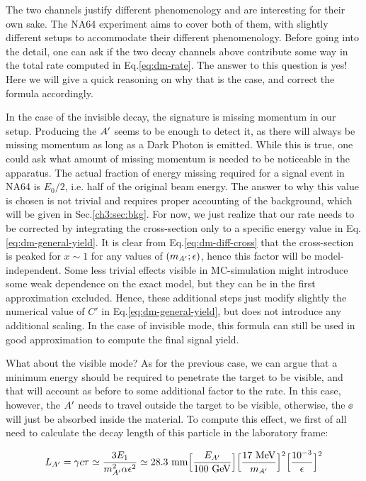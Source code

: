 The two channels justify different phenomenology and are interesting for their own sake. The NA64 experiment aims to cover both of them, with slightly different setups to accommodate their different phenomenology. Before going into the detail, one can ask if the two decay channels above contribute some way in the total rate computed in Eq.\ref{eq:dm-rate}. The answer to this question is yes! Here we will give a quick reasoning on why that is the case, and correct the formula accordingly.

In the case of the invisible decay, the signature is missing momentum in our setup. Producing the $A'$ seems to be enough to detect it, as there will always be missing momentum as long as a Dark Photon is emitted. While this is true, one could ask what amount of missing momentum is needed to be noticeable in the apparatus. The actual fraction of energy missing required for a signal event in NA64 is $E_0/2$, i.e. half of the original beam energy. The answer to why this value is chosen is not trivial and requires proper accounting of the background, which will be given in Sec.\ref{ch3:sec:bkg}.  For now, we just realize that our rate needs to be corrected by integrating the cross-section only to a specific energy value in Eq.\ref{eq:dm-general-yield}. It is clear from Eq.\ref{eq:dm-diff-cross} that the cross-section is peaked for $x \sim 1$ for any values of $(m_{A'};\epsilon)$, hence this factor will be model-independent. Some less trivial effects visible in MC-simulation might introduce some weak dependence on the exact model, but they can be in the first approximation excluded. Hence, these additional steps just modify slightly the numerical value of $C'$ in Eq.\ref{eq:dm-general-yield}, but does not introduce any additional scaling. In the case of invisible mode, this formula can still be used in good approximation to compute the final signal yield.

What about the visible mode? As for the previous case, we can argue that a minimum energy should be required to penetrate the target to be visible, and that will account as before to some additional factor to the rate. In this case, however, the $A'$ needs to travel outside the target to be visible, otherwise, the $\ee$ will just be absorbed inside the material. To compute this effect, we first of all need to calculate the decay length of this particle in the laboratory frame:

\begin{eqnarray}
  L_{A'} = \gamma c \tau \simeq \frac{3E_1}{m^2_{A'}\alpha \epsilon^2} \simeq 28.3 ~{\rm mm}  \Bigl[\frac{E_{A'}}{100~ {\rm GeV}}\Bigr] 
  \Bigl[\frac{17~ {\rm MeV}}{m_{A'}}\Bigr]^2 \Bigl[\frac{10^{-3}}{\epsilon}\Bigr]^2
  \label{eq:dm-decay-length}
\end{eqnarray}


